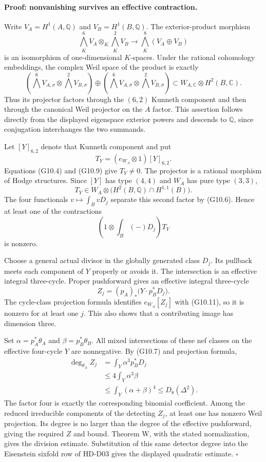 \paragraph{Proof: nonvanishing survives an effective contraction.}
Write $V_A=H^1(A,\mathbb Q)$ and $V_B=H^1(B,\mathbb Q)$.
The exterior-product morphism
\[
\bigwedge_K^6V_A\otimes_K\bigwedge_K^2V_B
\longrightarrow \bigwedge_K^8(V_A\oplus V_B)
\tag{G10.8}
\]
is an isomorphism of one-dimensional $K$-spaces. Under the
rational cohomology embeddings, the complex Weil space of the
product is exactly
\[
\left(\bigwedge^6 V_{A,\sigma}\otimes
\bigwedge^2 V_{B,\sigma}\right)
\oplus
\left(\bigwedge^6 V_{A,\bar\sigma}\otimes
\bigwedge^2 V_{B,\bar\sigma}\right)
\subset W_{A,\mathbb C}\otimes H^2(B,\mathbb C).
\tag{G10.9}
\]
Thus its projector factors through the $(6,2)$ Kunneth component
and then through the canonical Weil projector on the $A$ factor.
This assertion follows directly from the displayed eigenspace
exterior powers and descends to $\mathbb Q$, since conjugation
interchanges the two summands.

Let $[Y]_{6,2}$ denote that Kunneth component and put
\[
T_Y=(e_{W_A}\otimes1)[Y]_{6,2}.
\]
Equations (G10.4) and (G10.9) give $T_Y\ne0$. The projector is a
rational morphism of Hodge structures. Since $[Y]$ has type $(4,4)$
and $W_A$ has pure type $(3,3)$,
\[
T_Y\in W_A\otimes
\bigl(H^2(B,\mathbb Q)\cap H^{1,1}(B)\bigr).
\tag{G10.10}
\]
The four functionals $v\mapsto\int_BvD_j$ separate this second
factor by (G10.6). Hence at least one of the contractions
\[
\left(1\otimes\int_B(-)D_j\right)T_Y
\tag{G10.11}
\]
is nonzero.

Choose a general actual divisor in the globally generated class
$D_j$. Its pullback meets each component of $Y$ properly or avoids
it. The intersection is an effective integral three-cycle.
Proper pushforward gives an effective integral three-cycle
\[
Z_j=(p_A)_*\bigl(Y\cdot p_B^*D_j\bigr).
\tag{G10.12}
\]
The cycle-class projection formula identifies $e_{W_A}[Z_j]$
with (G10.11), so it is nonzero for at least one $j$.
This also shows that a contributing image has dimension three.

Set $\alpha=p_A^*\theta_A$ and $\beta=p_B^*\theta_B$.
All mixed intersections of these nef classes on the effective
four-cycle $Y$ are nonnegative. By (G10.7) and projection formula,
\[
\begin{split}
\deg_{\theta_A}Z_j
&=\int_Y\alpha^3p_B^*D_j\\
&\le4\int_Y\alpha^3\beta\\
&\le\int_Y(\alpha+\beta)^4
\le D_8(\Delta^2).
\end{split}
\tag{G10.13}
\]
The factor four is exactly the corresponding binomial coefficient.
Among the reduced irreducible components of the detecting $Z_j$,
at least one has nonzero Weil projection. Its degree is no larger
than the degree of the effective pushforward, giving the required
$Z$ and bound. Theorem W, with the stated normalization, gives
the division estimate. Substitution of this same detector degree into
the Eisenstein sixfold row of HD-D03 gives the displayed quadratic
estimate. \hfill$\square$

